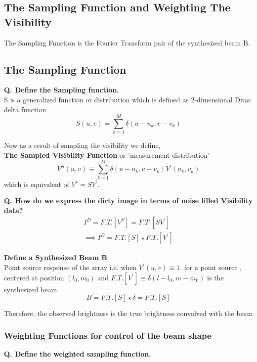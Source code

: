 \documentclass[10pt]{report}
\newcommand{\tbf}[1]{\textbf{#1}}
\newcommand{\cbox}{tcolorbox}
\begin{document}
\subsection{The Sampling Function and Weighting The Visibility} 
\begin{\cbox}
The Sampling Function is the Fourier Transform pair of the synthesized beam B. 
\end{\cbox}
\subsection{The Sampling Function}
\tbf{Q. Define the Sampling function.}\\

S is a generalized function or distribution which is defined as 2-dimensional Dirac delta function
\begin{equation}\label{eq:sampling}
S(u,v)=\sum^{M}_{k=1} \delta(u-u_k,v-v_k)
\end{equation}

Now as a result of sampling the visibility we define,\\

\tbf{The Sampled Visibility Function} or 'measurement distribution'\\
\begin{equation}
V^S(u,v)\equiv \sum^{M}_{k=1}\delta(u-u_k,v-v_k)V^\prime (u_k,v_k)
\end{equation} 
which is equivalent of $V^s=SV^\prime$.

\tbf{Q. How do we express the dirty image in terms of noise filled Visibility data?}\\
\begin{eqnarray*}
I^D=F.T.[V^S]=F.T.[SV^\prime]\\
\implies I^D=F.T.[S]\star F.T.[V^\prime]
\end{eqnarray*}

\tbf{Define a Synthesized Beam B}\\

Point source response of the array i.e. when $V^\prime(u,v)\equiv 1$, for a point source , centered at position $(l_0,m_0)$ and $F.T.[V^\prime]\equiv \delta(l-l_0,m-m_0)$ is the synthesized beam 
\begin{equation}
B=F.T.[S] \star \delta=F.T.[S]
\end{equation}
\begin{\cbox}
Therefore, the observed brightness is the true brightness convolved with the beam
\end{\cbox}
\subsubsection{Weighting Functions for control of the beam shape}
\tbf{Q. Define the weighted sampling function.}\\
\end{document}
